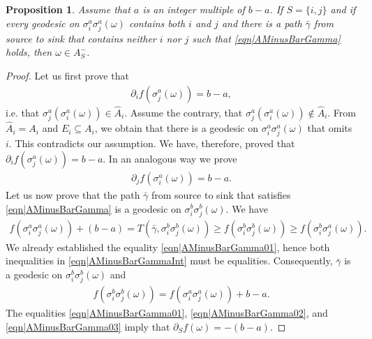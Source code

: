 \documentclass[reqno]{amsart}
\newtheorem{proposition}[theorem]{Proposition}
\begin{document}
\begin{proposition}\label{thm|Sufficient2AMinus} 
Assume that $a$ is an integer multiple of $b-a$. If $S=\{i,j\}$ and if every geodesic on $\sigma_i^a\sigma_j^a(\omega)$ contains both $i$ and $j$ and there is a path $\bar\gamma$ from source to sink that contains neither $i$ nor $j$ 
such that \eqref{eqn|AMinusBarGamma} holds, then $\omega\in A_S^-$.
\end{proposition}
\begin{proof} Let us first prove that \begin{eqnarray}\partial_if\left(\sigma_j^a(\omega)\right)=b-a, 
\label{eqn|AMinusBarGamma01} \end{eqnarray} i.e. that $\sigma_j^a\left(\sigma_i^a(\omega)\right)\in \hat A_i$.
Assume the contrary, that $\sigma_j^a\left(\sigma_i^a(\omega)\right)\not\in \hat A_i$. From $\hat A_i=A_i$ and $E_i\subseteq A_i$, we obtain that there is a geodesic on $\sigma_i^a\sigma_j^a(\omega)$ that omits $i$. This contradicts our assumption. We have, therefore, proved that $\partial_if\left(\sigma_j^a(\omega)\right)=b-a$. In an analogous way we prove \begin{eqnarray}\partial_jf\left(\sigma_i^a(\omega)\right)=b-a. 
\label{eqn|AMinusBarGamma02} \end{eqnarray} 
Let us now prove that the path $\bar\gamma$ from source to sink that satisfies \eqref{eqn|AMinusBarGamma} is a geodesic on $\sigma_i^b\sigma_j^b(\omega)$. 
 We have  \begin{eqnarray}
f\left(\sigma_i^a\sigma_j^a(\omega)\right)+(b-a)=
T\left(\bar\gamma,\sigma_i^b\sigma_j^b(\omega)\right)\geq f\left(\sigma_i^b\sigma_j^b(\omega)\right)\geq 
f\left(\sigma_i^b\sigma_j^a(\omega)\right). \label{eqn|AMinusBarGammaInt}\end{eqnarray}
We already established the equality \eqref{eqn|AMinusBarGamma01}, hence 
both inequalities in \eqref{eqn|AMinusBarGammaInt} must be equalities.
Consequently, $\bar\gamma$ is a geodesic on $\sigma_i^b\sigma_j^b(\omega)$ and
\begin{eqnarray}f\left(\sigma_i^b\sigma_j^b(\omega)\right)=f\left(\sigma_i^a\sigma_j^a(\omega)\right)+b-a. 
\label{eqn|AMinusBarGamma03} \end{eqnarray} 
The equalities \eqref{eqn|AMinusBarGamma01}, \eqref{eqn|AMinusBarGamma02}, and \eqref{eqn|AMinusBarGamma03} imply that $\partial_Sf(\omega)=-(b-a)$.
\end{proof}
\end{document}
